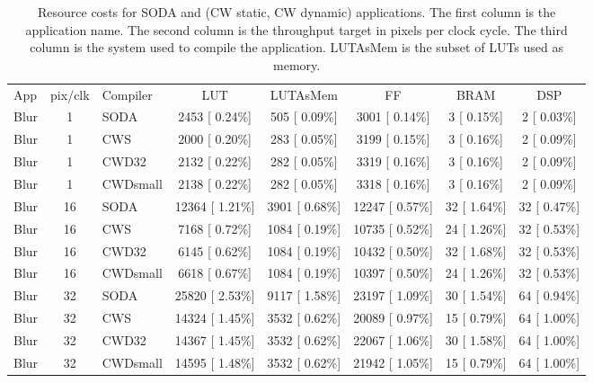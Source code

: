 \begin{table}
\caption{Resource costs for SODA and \cw (CW static, CW dynamic) applications. The first column is the application name. The second column is the throughput target in pixels per clock cycle. The third column is the system used to compile the application. LUTAsMem is the subset of LUTs used
as memory.}
\label{tab:vs_nump}
\scriptsize
\centering
\begin{tabular*}{\textwidth}{ l c l c c c c c}
\thickhline
 App & pix/clk & Compiler & LUT & LUTAsMem & FF & BRAM & DSP \\
 \thickhline

Blur &  1 & SODA & 2453 [ 0.24\%] &    505 [ 0.09\%] &    3001 [ 0.14\%] &    3 [ 0.15\%] &    2 [ 0.03\%] \\
Blur & 1 & CWS & 2000 [ 0.20\%] &    283 [ 0.05\%] &    3199 [ 0.15\%] &    3 [ 0.16\%] &     2 [ 0.09\%] \\
Blur & 1 & CWD32 & 2132 [ 0.22\%] &    282 [ 0.05\%] &    3319 [ 0.16\%] &    3 [ 0.16\%] &     2 [ 0.09\%] \\
Blur & 1 & CWDsmall &   2138 [ 0.22\%] &    282 [ 0.05\%] &    3318 [ 0.16\%] &    3 [ 0.16\%] &     2 [ 0.09\%] \\

  
\hline

  Blur & 16 & SODA &  12364 [ 1.21\%] &   3901 [ 0.68\%] &   12247 [ 0.57\%] &   32 [ 1.64\%] &      32 [ 0.47\%] \\
  Blur & 16 & CWS &   7168 [ 0.72\%] &   1084 [ 0.19\%] &   10735 [ 0.52\%] &   24 [ 1.26\%] &     32 [ 0.53\%] \\
  Blur & 16 & CWD32 &   6145 [ 0.62\%] &   1084 [ 0.19\%] &   10432 [ 0.50\%] &   32 [ 1.68\%] &    32 [ 0.53\%] \\
  Blur & 16 & CWDsmall &  6618 [ 0.67\%] &   1084 [ 0.19\%] &   10397 [ 0.50\%] &   24 [ 1.26\%] &    32 [ 0.53\%] \\
  
  \hline

  Blur & 32 & SODA & 25820 [ 2.53\%] &   9117 [ 1.58\%] &   23197 [ 1.09\%] &   30 [ 1.54\%] &    64 [ 0.94\%] \\
  Blur & 32 & CWS &  14324 [ 1.45\%] &   3532 [ 0.62\%] &   20089 [ 0.97\%] &   15 [ 0.79\%] &     64 [ 1.00\%] \\
  Blur & 32 & CWD32 & 14367 [ 1.45\%] &   3532 [ 0.62\%] &   22067 [ 1.06\%] &   30 [ 1.58\%] &     64 [ 1.00\%] \\
  Blur & 32 & CWDsmall & 14595 [ 1.48\%] &   3532 [ 0.62\%] &   21942 [ 1.05\%] &   15 [ 0.79\%] &    64 [ 1.00\%] \\
  

\end{tabular*}
\end{table}
